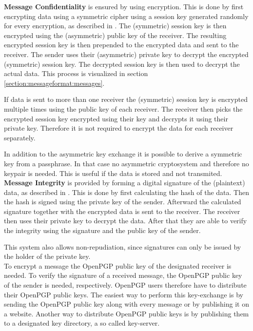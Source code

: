 \textbf{Message Confidentiality} is ensured by using encryption. This is done by first encrypting data using a symmetric cipher using a session key generated randomly for every encryption, as described in \cite[section 2.1]{RFC4880}. The (symmetric) session key is then encrypted using the (asymmetric) public key of the receiver. The resulting encrypted session key is then prepended to the encrypted data and sent to the receiver. The sender uses their (asymmetric) private key to decrypt the encrypted (symmetric) session key. The decrypted session key is then used to decrypt the actual data. This process is visualized in section \ref{section:messageformat:messages}. %

If data is sent to more than one receiver the (symmetric) session key is encrypted  multiple times using the public key of each receiver. The receiver then picks the encrypted session key encrypted using their key and decrypts it using their private key. Therefore it is not required to encrypt the data for each receiver separately.

In addition to the asymmetric key exchange it is possible to derive a symmetric key from a passphrase. In that case no asymmetric cryptosystem and therefore no keypair is needed. This is useful if the data is stored and not transmited.\\

\textbf{Message Integrity} is provided by forming a digital signature of the (plaintext) data, as described in \cite[section 2.2]{RFC4880}. This is done by first calculating the hash of the data. Then the hash is signed using the private key of the sender. Afterward the calculated signature together with the encrypted data is sent to the receiver. The receiver then uses their private key to decrypt the data. After that they are able to verify the integrity using the signature and the public key of the sender.

This system also allows non-repudiation, since signatures can only be issued by the holder of the private key.\\


To encrypt a message the OpenPGP public key of the designated receiver is needed. To verify the signature of a received message, the OpenPGP public key of the sender is needed, respectively. OpenPGP users therefore have to distribute their OpenPGP public keys. The easiest way to perform this key-exchange is by sending the OpenPGP public key along with every message or by publishing it on a website. Another way to distribute OpenPGP public keys is by publishing them to a designated key directory, a so called key-server.


